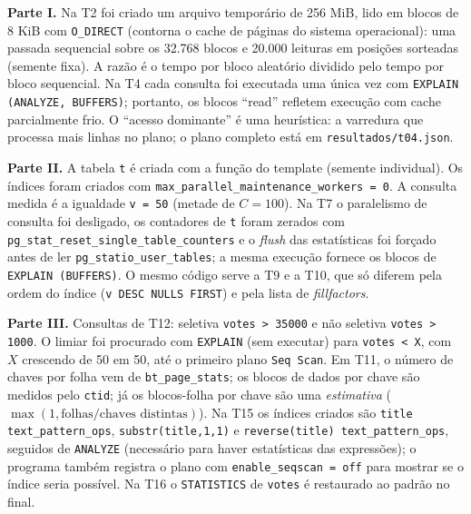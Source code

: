\documentclass[11pt,a4paper]{article}
\newcommand{\tp}[1]{\texttt{#1}}
\begin{document}
\textbf{Parte I.} Na T2 foi criado um arquivo temporário de 256 MiB, lido em blocos de 8 KiB com \tp{O\_DIRECT} (contorna o cache de páginas do sistema operacional): uma passada sequencial sobre os 32.768 blocos e 20.000 leituras em posições sorteadas (semente fixa). A razão é o tempo por bloco aleatório dividido pelo tempo por bloco sequencial. Na T4 cada consulta foi executada uma única vez com \tp{EXPLAIN (ANALYZE, BUFFERS)}; portanto, os blocos ``read'' refletem execução com cache parcialmente frio. O ``acesso dominante'' é uma heurística: a varredura que processa mais linhas no plano; o plano completo está em \tp{resultados/t04.json}.

\textbf{Parte II.} A tabela \tp{t} é criada com a função do template (semente individual). Os índices foram criados com \tp{max\_parallel\_maintenance\_workers = 0}. A consulta medida é a igualdade \tp{v = 50} (metade de $C = 100$). Na T7 o paralelismo de consulta foi desligado, os contadores de \tp{t} foram zerados com \tp{pg\_stat\_reset\_single\_table\_counters} e o \emph{flush} das estatísticas foi forçado antes de ler \tp{pg\_statio\_user\_tables}; a mesma execução fornece os blocos de \tp{EXPLAIN (BUFFERS)}. O mesmo código serve a T9 e a T10, que só diferem pela ordem do índice (\tp{v DESC NULLS FIRST}) e pela lista de \emph{fillfactors}.

\textbf{Parte III.} Consultas de T12: seletiva \tp{votes > 35000} e não seletiva \tp{votes > 1000}. O limiar foi procurado com \tp{EXPLAIN} (sem executar) para \tp{votes < X}, com $X$ crescendo de 50 em 50, até o primeiro plano \tp{Seq Scan}. Em T11, o número de chaves por folha vem de \tp{bt\_page\_stats}; os blocos de dados por chave são medidos pelo \tp{ctid}; já os blocos-folha por chave são uma \emph{estimativa} ($\max(1, \text{folhas}/\text{chaves distintas})$). Na T15 os índices criados são \tp{title text\_pattern\_ops}, \tp{substr(title,1,1)} e \tp{reverse(title) text\_pattern\_ops}, seguidos de \tp{ANALYZE} (necessário para haver estatísticas das expressões); o programa também registra o plano com \tp{enable\_seqscan = off} para mostrar se o índice seria possível. Na T16 o \tp{STATISTICS} de \tp{votes} é restaurado ao padrão no final.
\end{document}
